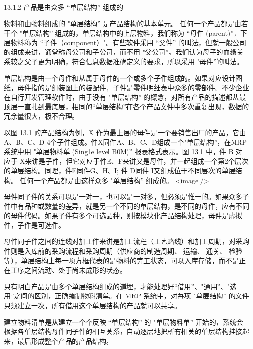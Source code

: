 13.1.2 产品是由众多 “单层结构” 组成的

    物料和由物料组成的 "单层结构” 是产品结构的基本单元。
    任何一个产品都是由若干个 "单层结构” 组成的，单层结构中的上层物料，我们称为 “母件 (parent)”，下层物料称为 “子件（component）"。有些软件采用 “父件” 的叫法，但就一般公司的组成来讲，通常称母公司和子公司，而不用 "父公司”。我们认为母子的血缘关系较之父子更为明确，符合信息数据准确定义的要求，所以采用 "母件”的叫法。

    单层结构是由一个母件和从属于母件的一个或多个子件组成的。如果对应设计图纸，母件指的是组装图上的装配件，子件是零件明细表中众多的零部件。不少企业在自行开发管理软件时，由于没有 "单层结构” 的概念，对所有产品的描述都从最顶层一直扎到最底层，相同的“单层结构”在各个产品文件中多次重复出现，数据的冗余量很大，极不合理。

    以图 13.1 的产品结构为例，X 作为最上层的母件是一个要销售出厂的产品，它由A、B、C、D 4个子件组成。件X同件A、B、C、D组成一个"单层结构”，在MRP系统中用 "单层物料单 (Sing1e level B0M)” 报表格式表示。图 13.1 中，件 B 对应于 X来讲是子件，但它对应于件E、F来讲又是母件，并一起组成一个第2个层次的单层结构。同理，件E同件G、H、I; 件 D同件 I又组成位于不同层次的单层结构。 任何一个产品都是由这样众多 "单层结构” 组成的。
<image />

    母件同子件的关系可以是一对一，也可以是一对多，但必须是惟一的。如果众多子件中有品种或数量的差异，就是另一个不同的单层结构，是不同的母件，应有不同的母件代码。如果子件有多个可选品种，则按模块化产品结构处理，母件是虚拟件，子件是可选件。

    母件同子件之间的连线对加工件来讲是加工流程（工艺路线）和加工周期，对采购件则是入库前的采购流程和采购周期（供应商的制造周期、 运输、 通关、 检验等），单层结构上每一项方框代表的是物料的完工状态，可以入库存储，而不是正在工序之间流动、处于尚未成形的状态。

    只有明白产品是由多个单层结构组成的道埋，才能处理好“借用”、"通用”、"选用”之间的区别，正确编制物料清单。在 MRP 系统中，对每项 "单层结构” 的文件只须建立一次，所有借用这个单层结构的产品就可以共享。

    建立物料清单是从建立一个个反映 “单层结构” 的 "单层物料单” 开始的，系统会根据各单层结构母件同子件的相互关系，自动逐层地把所有相关的单层结构挂接起来，最后形成整个产品的产品结构。
